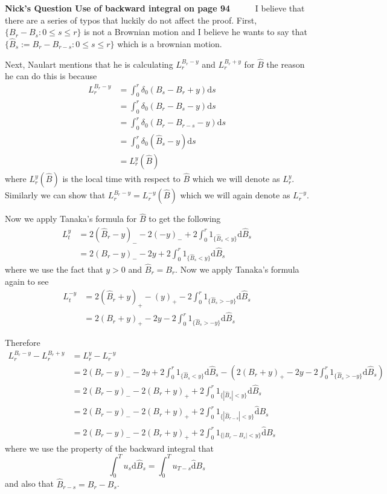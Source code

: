 \documentclass[a4paper,11pt]{article}
\numberwithin{equation}{section}
\theoremstyle{plain}
\theoremstyle{definition}
\newcommand{\ud}{\ensuremath{\mathrm{d}}}
\newcounter{NQ}
\newenvironment{NickQuestion}[1][] %
{\refstepcounter{NQ}
	\begin{mdframed}[backgroundcolor=lightgray]\textbf{Nick's Question \theNQ \: #1~~}~~~\noindent}%
	{\end{mdframed}}
\numberwithin{NQ}{section}
\numberwithin{LQ}{section}
\numberwithin{ZQ}{section}
\begin{document}
\begin{NickQuestion}[Use of backward integral on page 94]
	I believe that there are a series of typos that luckily do not affect the proof. First, $\{B_r-B_s: 0\le s \le r\}$ is not a Brownian motion and I believe he wants to say that $\{\hat{B}_s:=B_r-B_{r-s}: 0\le s \le r\}$ which is a brownian motion. 
	
	Next, Naulart mentions that he is calculating $L_r^{B_r-y}$ and $L_r^{B_r+y}$ for $\hat{B}$ the reason he can do this is because 
	\begin{align*}
		L_r^{B_r-y} &= \int_0^r \delta_0(B_s-B_r+y) \ud s 
		\\&= \int_0^r \delta_0(B_r-B_s -y) \ud s
		\\& = \int_0^r \delta_0(B_r-B_{r-s}-y) \ud s
		\\& = \int_0^r \delta_0(\hat{B}_s - y ) \ud s
		\\& = L_r^y(\hat{B})
	\end{align*}
where $L_r^y(\hat{B})$ is the local time with respect to $\hat{B}$ which we will denote as $L_r^y$. Similarly we can show that $	L_r^{B_r-y} = L_r^{-y}(\hat{B})$ which we will again denote as $L_r^{-y}$.

Now we apply Tanaka's formula for $\hat{B}$ to get the following
\begin{align*}
	L_t^y &= 2(\hat{B}_r-y)_{-}-2(-y)_{-}+2\int_0^r 1_{\{\hat{B}_s < y\}} \ud \hat{B}_s
	\\& = 2(B_r-y)_{-}-2y+2\int_0^r 1_{\{\hat{B}_s < y\}} \ud \hat{B}_s
\end{align*}
where we use the fact that $y>0$ and $\hat{B}_r =B_r$. Now we apply Tanaka's formula again to see
\begin{align*}
L_t^{-y} &= 2(\hat{B}_r+y)_+ - (y)_+ - 2\int_0^r 1_{\{\hat{B}_s > -y\}} \ud \hat{B}_s
\\& = 2(B_r+y)_+ - 2y - 2\int_0^r 1_{\{\hat{B}_s > -y\}} \ud \hat{B}_s
\end{align*}

Therefore 
\begin{align*}
	L_r^{B_r-y} - L_r^{B_r+ y}& = L_r^y - L_r^{-y}
	\\& = 2(B_r-y)_{-}-2y+2\int_0^r 1_{\{\hat{B}_s < y\}} \ud \hat{B}_s - \left(2(B_r+y)_+ - 2y - 2\int_0^r 1_{\{\hat{B}_s > -y\}} \ud \hat{B}_s \right)
	\\& = 2(B_r-y)_{-}-2(B_r+y)_+ + 2\int_0^r 1_{\{|\hat{B}_s| < y\}} \ud \hat{B}_s
	\\&= 2(B_r-y)_{-}-2(B_r+y)_+ + 2\int_0^r 1_{\{|\hat{B}_{r-s}| < y\}} \hat{\ud} B_s
	\\& =  2(B_r-y)_{-}-2(B_r+y)_+ + 2\int_0^r 1_{\{|B_r-B_s| < y\}} \hat{\ud} B_s
\end{align*}
where we use the property of the backward integral that 
\[
	\int_0^T u_s \ud \hat{B}_s = \int_0^T u_{T-s} \hat{\ud}B_s
\]
and also that $\hat{B}_{r-s} = B_r-B_s$. 


\end{NickQuestion}
\end{document}
